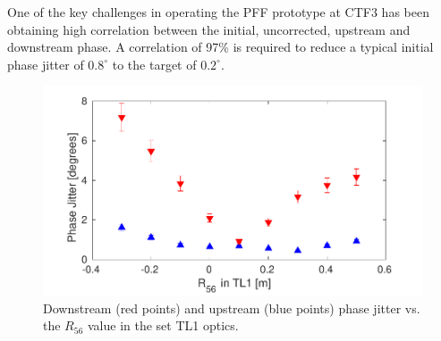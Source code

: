 \documentclass[%
 reprint,
superscriptaddress,
 amsmath,amssymb,
 prl,
]{revtex4-1}
\begin{document}
One of the key challenges in operating the PFF prototype at CTF3 has been 
obtaining high correlation between the initial, uncorrected, upstream and 
downstream phase. A correlation of 97\% is required to reduce a typical initial 
phase jitter of \(0.8^\circ\) to the target of \(0.2^\circ\). 


\begin{figure}
	\includegraphics[width=\columnwidth]{figs/r56Scan}%
	\caption{\label{fig:r56Scan}Downstream (red points) and upstream (blue 
		points) phase jitter vs. the \(R_{56}\) value in the set TL1 optics. 
		}
\end{figure}

\end{document}
